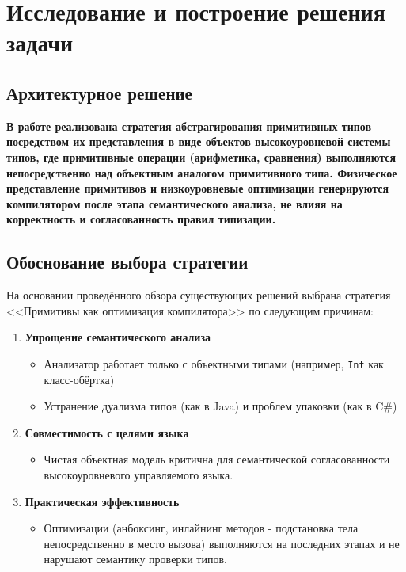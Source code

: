 \section{Исследование и построение решения задачи}
\label{sec:Chapter3} 
\subsection{Архитектурное решение}

\textbf{В работе реализована стратегия абстрагирования примитивных типов посредством их представления в виде объектов высокоуровневой системы типов, где примитивные операции (арифметика, сравнения) выполняются непосредственно над объектным аналогом примитивного типа. Физическое представление примитивов и низкоуровневые оптимизации генерируются компилятором после этапа семантического анализа, не влияя на корректность и согласованность правил типизации.}

\subsection{Обоснование выбора стратегии}
На основании проведённого обзора существующих решений выбрана стратегия <<Примитивы как оптимизация компилятора>> по следующим причинам:

\begin{enumerate}
    \item \textbf{Упрощение семантического анализа}
    \begin{itemize}[label={--}]
        \item Анализатор работает только с объектными типами (например, \texttt{Int} как класс-обёртка)
        \item Устранение дуализма типов (как в Java) и проблем упаковки (как в C\#)
    \end{itemize}

    \item \textbf{Совместимость с целями языка}
    \begin{itemize}[label={--}]
        \item Чистая объектная модель критична для семантической согласованности высокоуровневого управляемого языка.
    \end{itemize}

    \item \textbf{Практическая эффективность}
    \begin{itemize}[label={--}]
        \item Оптимизации (анбоксинг, инлайнинг методов - подстановка тела непосредственно в место вызова) выполняются на последних этапах и не нарушают семантику проверки типов.
    \end{itemize}
\end{enumerate}

